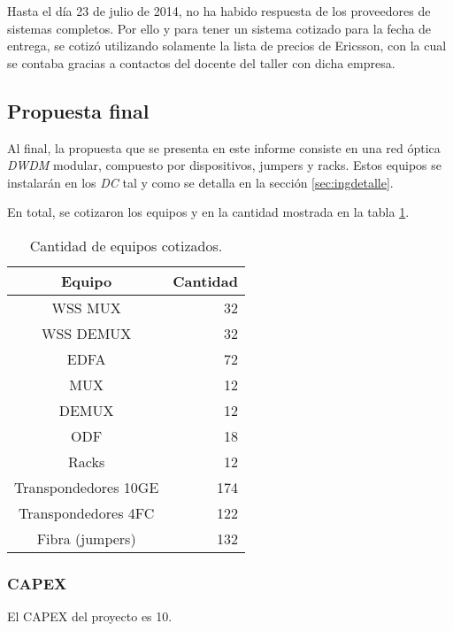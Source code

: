 
Hasta el día 23 de julio de 2014, no ha habido respuesta de los
proveedores de sistemas completos. Por ello y para tener un sistema
cotizado para la fecha de entrega, se cotizó utilizando solamente la
lista de precios de Ericsson, con la cual se contaba gracias a
contactos del docente del taller con dicha empresa.

\subsection{Propuesta final}
\label{sec:ppfinal}

Al final, la propuesta que se presenta en este informe consiste en una
red óptica \emph{DWDM} modular, compuesto por dispositivos, jumpers y
racks. Estos equipos se instalarán en los \emph{DC} tal y como se
detalla en la sección \ref{sec:ingdetalle}.

En total, se cotizaron los equipos y en la cantidad mostrada en la
tabla \ref{tab:propfinal}.

\begin{table}[H]
  \centering
  \begin{tabular}{| c | r |}
    \hline
    Equipo & Cantidad \\
    \hline
    WSS MUX & 32 \\
    WSS DEMUX & 32 \\
    EDFA & 72 \\
    MUX & 12 \\
    DEMUX & 12 \\
    ODF & 18 \\
    Racks & 12 \\
    Transpondedores 10GE & 174 \\
    Transpondedores 4FC & 122 \\
    Fibra (jumpers) & 132 \\
    \hline
  \end{tabular}
  \caption{Cantidad de equipos cotizados.}
  \label{tab:propfinal}
\end{table}

\subsubsection{CAPEX}
\label{sec:capex}

El CAPEX del proyecto es 10.

